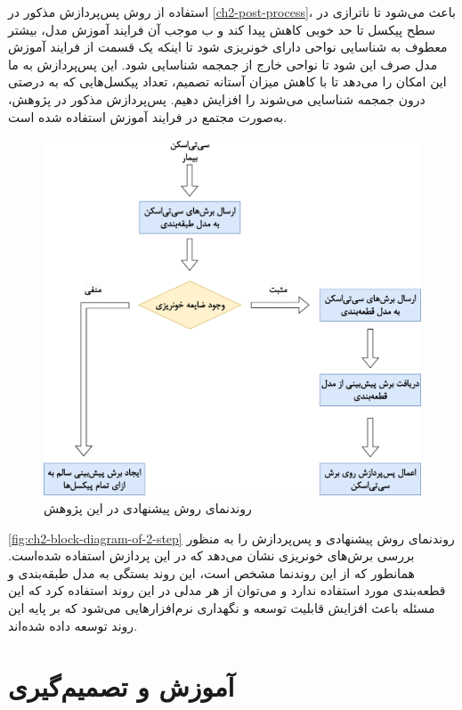استفاده از روش پس‌پردازش مذکور در 
\autoref{ch2-post-process}،
باعث می‌شود تا ناترازی در سطح پیکسل تا حد خوبی کاهش پیدا کند و ب موجب آن فرایند آموزش مدل، بیشتر معطوف به شناسایی نواحی دارای خونریزی شود تا اینکه یک قسمت از فرایند آموزش مدل صرف این شود تا نواحی خارج از جمجمه شناسایی شود. این پس‌پردازش به ما این امکان را می‌دهد تا با کاهش میزان آستانه تصمیم، تعداد پیکسل‌هایی که به درصتی درون جمجمه شناسایی می‌شوند را افزایش دهیم. پس‌پردازش مذکور در پژوهش، به‌صورت مجتمع در فرایند آموزش استفاده شده است.
\begin{figure}[h]
\centering
\includegraphics[height=0.5\textheight]{"Images/Chapter2/block diagram of 2 step .drawio"}
\caption{روندنمای روش پیشنهادی در این پژوهش}
\label{fig:ch2-block-diagram-of-2-step}
\end{figure}

\autoref{fig:ch2-block-diagram-of-2-step}
روندنمای روش پیشنهادی و پس‌پردازش را به منظور بررسی برش‌های خونریزی نشان می‌دهد که در این پردازش استفاده شده‌است. همانطور که از این روند‌نما مشخص است، این روند بستگی به مدل طبقه‌بندی و قطعه‌بندی مورد استفاده ندارد و می‌توان از هر مدلی در این روند استفاده کرد که این مسئله باعث افزایش قابلیت توسعه و نگهداری نرم‌افزارهایی می‌شود که بر پایه این روند توسعه داده‌ شده‌اند.

\section{آموزش و تصمیم‌گیری}

